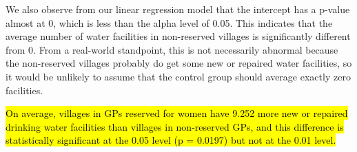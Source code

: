 \documentclass[12pt,letterpaper]{article}
\begin{document}
\begin{enumerate}
	We also observe from our linear regression model that the intercept has a p-value almost at 0, which is less than the alpha level of 0.05. This indicates that the average number of water facilities in non-reserved villages is significantly different from 0. From a real-world standpoint, this is not necessarily abnormal because the non-reserved villages probably do get some new or repaired water facilities, so it would be unlikely to assume that the control group should average exactly zero facilities.
	
	\hl{On average, villages in GPs reserved for women have 9.252 more new or repaired drinking water facilities than villages in non-reserved GPs, and this difference is statistically significant at the 0.05 level (p = 0.0197) but not at the 0.01 level.}
	
\end{enumerate}


\end{document}
